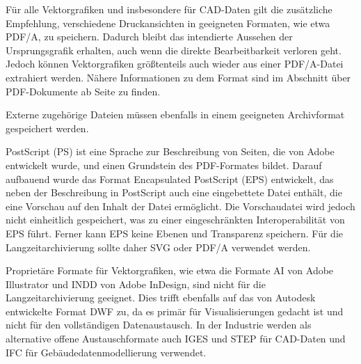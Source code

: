 Für alle Vektorgrafiken und insbesondere für CAD-Daten gilt die zusätzliche Empfehlung, verschiedene Druckansichten in geeigneten Formaten, wie etwa PDF/A, zu speichern. Dadurch bleibt das intendierte Aussehen der Ursprungsgrafik erhalten, auch wenn die direkte Bearbeitbarkeit verloren geht. Jedoch können Vektorgrafiken größtenteils auch wieder aus einer PDF/A-Datei extrahiert werden. Nähere Informationen zu dem Format sind im Abschnitt über PDF-Dokumente ab Seite \pageref{pdf-dokumente} zu finden.

Externe zugehörige Dateien müssen ebenfalls in einem geeigneten Archivformat gespeichert werden.

PostScript (PS) ist eine Sprache zur Beschreibung von Seiten, die von Adobe entwickelt wurde, und einen Grundstein des PDF-Formates bildet. Darauf aufbauend wurde das Format Encapsulated PostScript (EPS) entwickelt, das neben der Beschreibung in PostScript auch eine eingebettete Datei enthält, die eine Vorschau auf den Inhalt der Datei ermöglicht. Die Vorschaudatei wird jedoch nicht einheitlich gespeichert, was zu einer eingeschränkten Interoperabilität von EPS führt. Ferner kann EPS keine Ebenen und Transparenz speichern. Für die Langzeitarchivierung sollte daher SVG oder PDF/A verwendet werden.

Proprietäre Formate für Vektorgrafiken, wie etwa die Formate AI von Adobe Illustrator und INDD von Adobe InDesign, sind nicht für die Langzeitarchivierung geeignet. Dies trifft ebenfalls auf das von Autodesk entwickelte Format DWF zu, da es primär für Visualisierungen gedacht ist und nicht für den vollständigen Datenaustausch. In der Industrie werden als alternative offene Austauschformate auch IGES und STEP für CAD-Daten und IFC für Gebäudedatenmodellierung verwendet.

